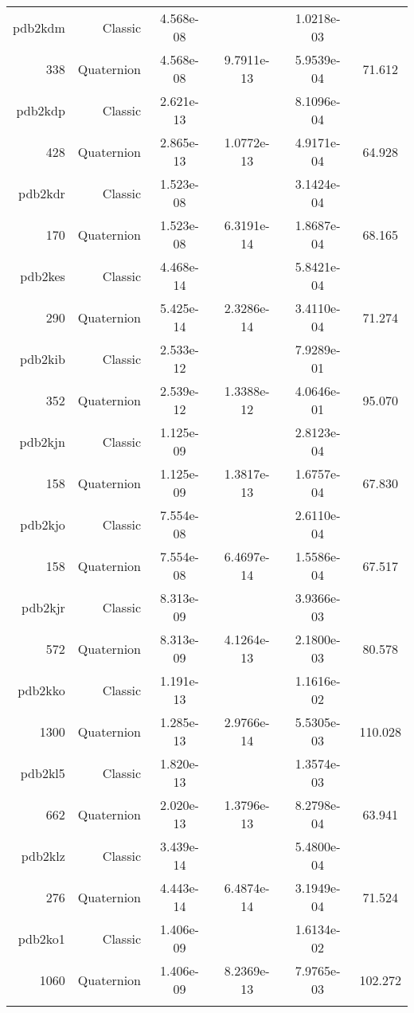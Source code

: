 \begin{xltabular}{\textwidth}{r|rS[table-format=1.3e+2]S[table-format=1.4e+2]S[table-format=1.4e+2]S[table-format=-1.3]}
pdb2kdm & Classic & 4.568e-08 &  & 1.0218e-03 & \\
338 & Quaternion & 4.568e-08 & 9.7911e-13 & 5.9539e-04 & 71.612\\  \addlinespace
pdb2kdp & Classic & 2.621e-13 &  & 8.1096e-04 & \\
428 & Quaternion & 2.865e-13 & 1.0772e-13 & 4.9171e-04 & 64.928\\  \addlinespace
pdb2kdr & Classic & 1.523e-08 &  & 3.1424e-04 & \\
170 & Quaternion & 1.523e-08 & 6.3191e-14 & 1.8687e-04 & 68.165\\  \addlinespace
pdb2kes & Classic & 4.468e-14 &  & 5.8421e-04 & \\
290 & Quaternion & 5.425e-14 & 2.3286e-14 & 3.4110e-04 & 71.274\\  \addlinespace
pdb2kib & Classic & 2.533e-12 &  & 7.9289e-01 & \\
352 & Quaternion & 2.539e-12 & 1.3388e-12 & 4.0646e-01 & 95.070\\  \addlinespace
pdb2kjn & Classic & 1.125e-09 &  & 2.8123e-04 & \\
158 & Quaternion & 1.125e-09 & 1.3817e-13 & 1.6757e-04 & 67.830\\  \addlinespace
pdb2kjo & Classic & 7.554e-08 &  & 2.6110e-04 & \\
158 & Quaternion & 7.554e-08 & 6.4697e-14 & 1.5586e-04 & 67.517\\  \addlinespace
pdb2kjr & Classic & 8.313e-09 &  & 3.9366e-03 & \\
572 & Quaternion & 8.313e-09 & 4.1264e-13 & 2.1800e-03 & 80.578\\  \addlinespace
pdb2kko & Classic & 1.191e-13 &  & 1.1616e-02 & \\
1300 & Quaternion & 1.285e-13 & 2.9766e-14 & 5.5305e-03 & 110.028\\  \addlinespace
pdb2kl5 & Classic & 1.820e-13 &  & 1.3574e-03 & \\
662 & Quaternion & 2.020e-13 & 1.3796e-13 & 8.2798e-04 & 63.941\\  \addlinespace
pdb2klz & Classic & 3.439e-14 &  & 5.4800e-04 & \\
276 & Quaternion & 4.443e-14 & 6.4874e-14 & 3.1949e-04 & 71.524\\  \addlinespace
pdb2ko1 & Classic & 1.406e-09 &  & 1.6134e-02 & \\
1060 & Quaternion & 1.406e-09 & 8.2369e-13 & 7.9765e-03 & 102.272\\  \addlinespace

\end{xltabular}
